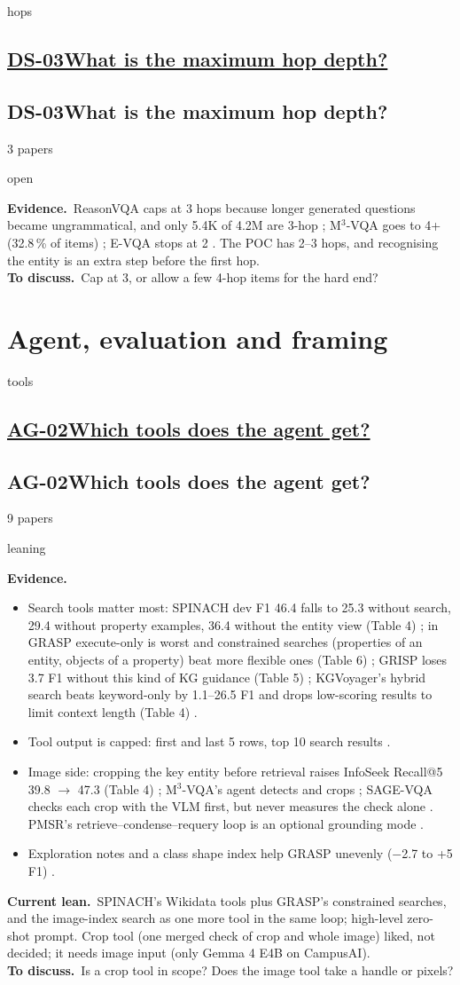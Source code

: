 \documentclass[10pt,a4paper]{article}
\newcommand{\st}[2]{\colorbox{#1}{\footnotesize\strut #2}}
\newcommand{\leaning}{\st{yellow!35}{leaning}}
\newcommand{\open}{\st{red!15}{open}}
\newcommand{\qblock}[1][]{\def\qkey{#1}\qblockx}
\newcommand{\qblockx}[4]{%
  \ifx\qkey\empty
  \subsection*{\underline{#1\quad #2}}%
  \else\hypertarget{\qkey}{}
  \subsection*{#1\quad #2}\fi%
{\footnotesize #3 papers\quad}#4\par}
\newcommand{\ev}{\textbf{Evidence.}}
\newcommand{\lean}{\textbf{Current lean.}}
\newcommand{\ask}{\textbf{To discuss.}}
\begin{document}
\qblock[hops]{DS-03}{What is the maximum hop depth?}{3}{\open}
\ev\ ReasonVQA caps at 3 hops because longer generated questions became
ungrammatical, and only 5.4K of 4.2M are 3-hop \cite{tran2025reasonvqa};
M$^3$-VQA goes to 4+ (32.8\,\% of items) \cite{ma2026m3}; E-VQA stops at 2
\cite{mensink2023encyclopedic}. The POC has 2--3 hops, and recognising the
entity is an extra step before the first hop.\\
\ask\ Cap at 3, or allow a few 4-hop items for the hard end?

\section{Agent, evaluation and framing}

\qblock[tools]{AG-02}{Which tools does the agent get?}{9}{\leaning}
\ev
\begin{itemize}
  \item Search tools matter most: SPINACH dev F1 46.4 falls to 25.3 without
    search, 29.4 without property examples, 36.4 without the entity view
    (Table 4) \cite{liu2024spinach}; in GRASP execute-only is worst and
    constrained searches (properties of an entity, objects of a property)
    beat more flexible ones (Table 6) \cite{walter2025grasp}; GRISP loses 3.7
    F1 without this kind of KG guidance (Table 5) \cite{walter2026grisp};
    KGVoyager's hybrid search beats keyword-only by 1.1--26.5 F1 and drops
    low-scoring results to limit context length (Table 4)
    \cite{wisam2026kgvoyager}.
  \item Tool output is capped: first and last 5 rows, top 10 search results
    \cite{liu2024spinach,walter2025grasp}.
  \item Image side: cropping the key entity before retrieval raises InfoSeek
    Recall@5 39.8 $\to$ 47.3 (Table 4) \cite{jian2024large}; M$^3$-VQA's
    agent detects and crops \cite{ma2026m3}; SAGE-VQA checks each crop with
    the VLM first, but never measures the check alone \cite{shen2026sage}.
    PMSR's retrieve--condense--requery loop is an optional grounding mode
    \cite{choi2025progressive}.
  \item Exploration notes and a class shape index help GRASP unevenly
    ($-$2.7 to +5 F1) \cite{walter2026grasp}.
\end{itemize}
\lean\ SPINACH's Wikidata tools plus GRASP's constrained searches, and the
image-index search as one more tool in the same loop; high-level zero-shot
prompt. Crop tool (one merged check of crop and whole image) liked, not
decided; it needs image input (only Gemma 4 E4B on CampusAI).\\
\ask\ Is a crop tool in scope? Does the image tool take a handle or pixels?
\end{document}
